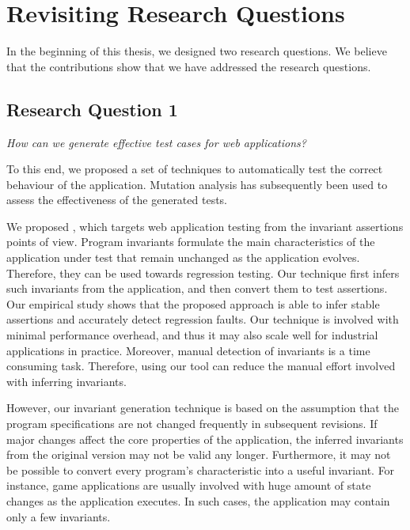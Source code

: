 \section{Revisiting Research Questions} 
In the beginning of this thesis, we designed two research questions. We believe that the contributions show that we have addressed the research questions.
\subsection{Research Question 1}

\emph{How can we generate effective test cases for \javascript web applications?}

To this end, we proposed a set of techniques to automatically test the correct behaviour of the application. Mutation analysis has subsequently been used to assess the effectiveness of the generated tests. 

 We proposed \jsart, which targets web application testing from the invariant assertions points of view. Program invariants formulate the main characteristics of the application under test that remain unchanged as the application evolves. Therefore, they can be used towards regression testing. Our technique first infers such invariants from the application, and then convert them to test assertions. Our empirical study shows that the proposed approach is able to infer stable assertions and accurately detect regression faults. Our technique is involved with minimal performance overhead, and thus it may also scale well for industrial applications in practice.  Moreover, manual detection of invariants is a time consuming task. Therefore, using our tool can reduce the manual effort involved with inferring invariants. 

However, our invariant generation technique is based on the assumption that the program specifications are not changed frequently in subsequent revisions. If major changes affect the core properties of the application, the inferred invariants from the original version may not be valid any longer. Furthermore, it may not be possible to convert every program's characteristic into a useful invariant. For instance, game applications are usually involved with huge amount of state changes as the application executes. In such cases, the application may contain only a few invariants. 

